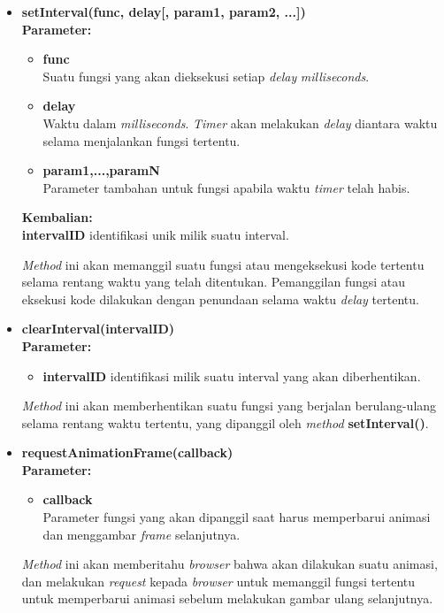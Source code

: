 \begin{itemize}
	\item \textbf{setInterval(func, delay[, param1, param2, ...])} \\
	\textbf{Parameter:}
	\begin{itemize}
		\item \textbf{func} \\
		Suatu fungsi yang akan dieksekusi setiap \textit{delay} \textit{milliseconds}.
		
		\item \textbf{delay} \\
		Waktu dalam \textit{milliseconds}. \textit{Timer} akan melakukan \textit{delay} diantara waktu selama menjalankan fungsi tertentu.
		
		\item \textbf{param1,...,paramN} \\
		Parameter tambahan untuk fungsi apabila waktu \textit{timer} telah habis.
	\end{itemize}
	
	\textbf{Kembalian:} \\ 
	\textbf{intervalID} identifikasi unik milik suatu interval.

	\textit{Method} ini akan memanggil suatu fungsi atau mengeksekusi kode tertentu selama rentang waktu yang telah ditentukan. Pemanggilan fungsi atau eksekusi kode dilakukan dengan penundaan selama waktu \textit{delay} tertentu.
	
	\item \textbf{clearInterval(intervalID)} \\
	\textbf{Parameter:}
	\begin{itemize}
		\item \textbf{intervalID} identifikasi milik suatu interval yang akan diberhentikan.
	\end{itemize}

	\textit{Method} ini akan memberhentikan suatu fungsi yang berjalan berulang-ulang selama rentang waktu tertentu, yang dipanggil oleh \textit{method} \textbf{setInterval()}.
	
	
	\item \textbf{requestAnimationFrame(callback)} \\
	\textbf{Parameter:} \\
	\begin{itemize}
		\item \textbf{callback} \\
		Parameter fungsi yang akan dipanggil saat harus memperbarui animasi dan menggambar \textit{frame} selanjutnya.
	\end{itemize}

	\textit{Method} ini akan memberitahu \textit{browser} bahwa akan dilakukan suatu animasi, dan melakukan \textit{request} kepada \textit{browser} untuk memanggil fungsi tertentu untuk memperbarui animasi sebelum melakukan gambar ulang selanjutnya.
\end{itemize} 


